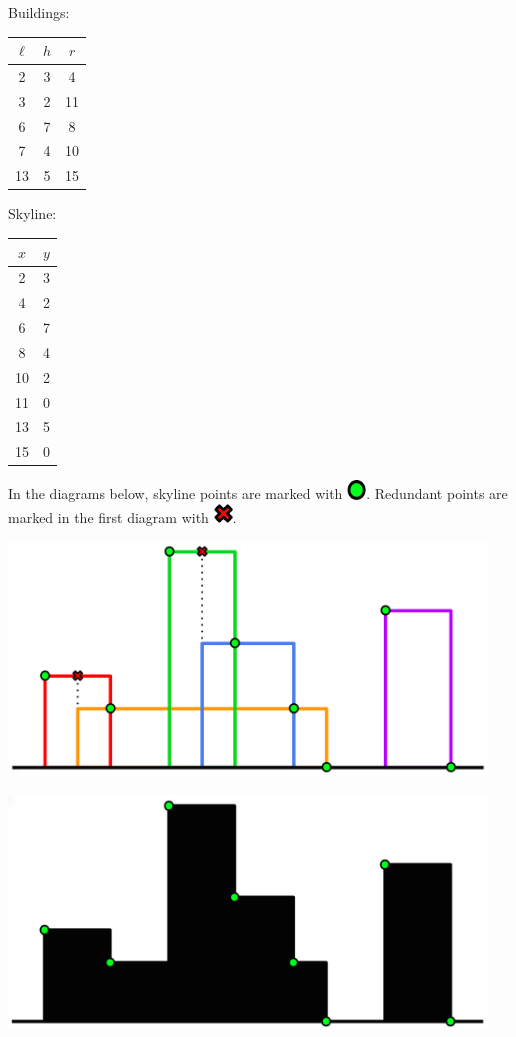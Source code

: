 \begin{example}
Buildings:
\begin{tabular}[t]{ccc}
  $\ell$ & $h$ & $r$ \\\hline
  2 & 3 & 4 \\
  3 & 2 & 11 \\
  6 & 7 & 8 \\
  7 & 4 & 10 \\
  13 & 5 & 15 \\
\end{tabular}

Skyline:
\begin{tabular}[t]{cc}
  $x$ & $y$ \\\hline
  2 & 3 \\
  4 & 2 \\
  6 & 7 \\
  8 & 4 \\
  10 & 2 \\
  11 & 0 \\
  13 & 5 \\
  15 & 0 \\
\end{tabular}

In the diagrams below, skyline points are marked with
\includegraphics[width=0.2in]{./skyline/media/circ.png}. Redundant points are
marked in the first diagram with
\includegraphics[width=0.2in]{./skyline/media/x.png}.

\includegraphics[width=5in]{./skyline/media/skyline.png}

\includegraphics[width=5in]{./skyline/media/silhouette-points.png}
\end{example}


